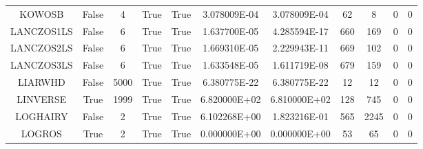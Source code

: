 \begin{longtable}{ccccccccccc}
	\cellcolor{default2} KOWOSB& \cellcolor{default2} False& \cellcolor{default2} 4& \cellcolor{default2} True& \cellcolor{default2} True& \cellcolor{best} 3.078009E-04& \cellcolor{best} 3.078009E-04& \cellcolor{poor} 62& \cellcolor{best} 8& \cellcolor{default2} 0& \cellcolor{default2} 0\\
	\cellcolor{default1} LANCZOS1LS& \cellcolor{default1} False& \cellcolor{default1} 6& \cellcolor{default1} True& \cellcolor{default1} True& \cellcolor{ok} 1.637700E-05& \cellcolor{best} 4.285594E-17& \cellcolor{poor} 660& \cellcolor{best} 169& \cellcolor{default1} 0& \cellcolor{default1} 0\\
	\cellcolor{default2} LANCZOS2LS& \cellcolor{default2} False& \cellcolor{default2} 6& \cellcolor{default2} True& \cellcolor{default2} True& \cellcolor{ok} 1.669310E-05& \cellcolor{best} 2.229943E-11& \cellcolor{poor} 669& \cellcolor{best} 102& \cellcolor{default2} 0& \cellcolor{default2} 0\\
	\cellcolor{default1} LANCZOS3LS& \cellcolor{default1} False& \cellcolor{default1} 6& \cellcolor{default1} True& \cellcolor{default1} True& \cellcolor{ok} 1.633548E-05& \cellcolor{best} 1.611719E-08& \cellcolor{poor} 679& \cellcolor{best} 159& \cellcolor{default1} 0& \cellcolor{default1} 0\\
	\cellcolor{default2} LIARWHD& \cellcolor{default2} False& \cellcolor{default2} 5000& \cellcolor{default2} True& \cellcolor{default2} True& \cellcolor{ok} 6.380775E-22& \cellcolor{best} 6.380775E-22& \cellcolor{best} 12& \cellcolor{best} 12& \cellcolor{default2} 0& \cellcolor{default2} 0\\
	\cellcolor{default1} LINVERSE& \cellcolor{default1} True& \cellcolor{default1} 1999& \cellcolor{default1} True& \cellcolor{default1} True& \cellcolor{poor} 6.820000E+02& \cellcolor{best} 6.810000E+02& \cellcolor{best} 128& \cellcolor{poor} 745& \cellcolor{default1} 0& \cellcolor{default1} 0\\
	\cellcolor{default2} LOGHAIRY& \cellcolor{default2} False& \cellcolor{default2} 2& \cellcolor{default2} True& \cellcolor{default2} True& \cellcolor{poor} 6.102268E+00& \cellcolor{best} 1.823216E-01& \cellcolor{best} 565& \cellcolor{poor} 2245& \cellcolor{default2} 0& \cellcolor{default2} 0\\
	\cellcolor{default1} LOGROS& \cellcolor{default1} True& \cellcolor{default1} 2& \cellcolor{default1} True& \cellcolor{default1} True& \cellcolor{best} 0.000000E+00& \cellcolor{best} 0.000000E+00& \cellcolor{best} 53& \cellcolor{ok} 65& \cellcolor{default1} 0& \cellcolor{default1} 0\\

\end{longtable}

